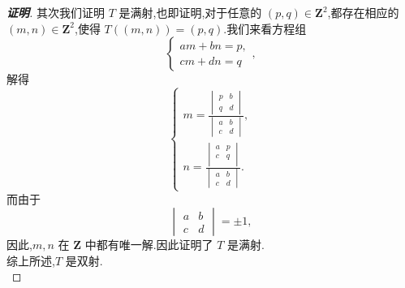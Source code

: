 \documentclass[twoside,11pt]{article}
\begin{document}
\begin{proof}[\textbf{证明}]
其次我们证明 $T$ 是满射,也即证明,对于任意的
$(p,q)\in \mathbf{Z}^2$,都存在相应的 $(m,n)\in \mathbf{Z}^2$,使得
$T((m,n))=(p,q)$.我们来看方程组
\begin{equation}\label{eq:1}
\begin{cases}
  am+bn=p,\\
cm+dn=q
\end{cases},
\end{equation}
解得
\begin{equation}\label{eq:2}
\begin{cases}
  m=\frac{\begin{vmatrix}
    p&b\\
q&d
  \end{vmatrix}}{\begin{vmatrix}
    a&b\\
c&d
  \end{vmatrix}},\\
n=\frac{\begin{vmatrix}
    a&p\\
c&q\\
  \end{vmatrix}}{\begin{vmatrix}
    a&b\\
c&d
  \end{vmatrix}}.
\end{cases}
\end{equation}
而由于 
$$
\begin{vmatrix}
  a&b\\
c&d
\end{vmatrix}=\pm 1,
$$
因此,$m,n$ 在 $\mathbf{Z}$ 中都有唯一解.因此证明了 $T$ 是满射.\\

综上所述,$T$ 是双射.\\


\end{proof}
\end{document}
